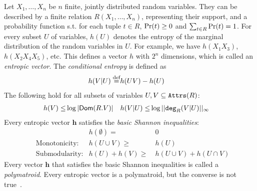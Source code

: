Let $X_1,\ldots, X_n$ be $n$ finite, jointly distributed random
variables.  They can be described by a finite relation
$R(X_1, \ldots, X_n)$, representing their support, and a probability
function s.t. for each tuple $t \in R$, $\mathop{\textnormal{Pr}}(t)\geq 0$ and
$\sum_{t \in R}\mathop{\textnormal{Pr}}(t)=1$.  For every subset $U$ of variables, $h(U)$
denotes the entropy of the marginal distribution of the random variables
in $U$.  For example, we have $h(X_1X_3)$, $h(X_2X_4X_5)$, etc.  This
defines a vector $h$ with $2^n$ dimensions, which is called an
\emph{entropic vector}.  The \emph{conditional entropy} is defined as
%
\begin{align}
  h(V|U) \stackrel{\text{def}}{=} & h(UV) - h(U) \label{eq:chain}
\end{align}
%
The following hold for all subsets of variables
$U, V \subseteq \texttt{Attrs}(R)$:
%
\begin{align}
  h(V) \leq & \log|\textsf{Dom}(R.V)| & h(V|U) \leq & \log||\texttt{deg}_R(V|U)||_\infty \label{eq:h:log}
\end{align}
%
Every entropic vector $\bm h$ satisfies the \emph{basic Shannon
  inequalities}:
%
\begin{align}
&&  h(\emptyset) =&\ 0\nonumber\\
&\text{Monotonicity:}&  h(U\cup V) \geq &\  h(U)\label{eq:shannon:monotonicity}\\
&\text{Submodularity:}&  h(U)+h(V)\geq &\  h(U\cup V)+h(U\cap V)\label{eq:shannon:submodularity}
\end{align}
%
Every vector $\bm h$ that satisfies the basic Shannon inequalities is
called a \emph{polymatroid}.  Every entropic vector is a polymatroid,
but the converse is not
true~\cite{zhang1998characterization,Yeung:2008:ITN:1457455}.
%
